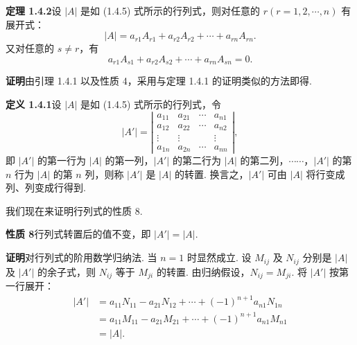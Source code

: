 \documentclass[UTF8, 12pt, fontset=fandol, oneside]{ctexart}
\begin{document}
\noindent\textbf{定理 1.4.2}\quad 设 $|A|$ 是如 (1.4.5) 式所示的行列式，则对任意的 $r(r=1,2,\cdots,n)$ 有展开式：
\begin{equation}
|A|=a_{r1}A_{r1}+a_{r2}A_{r2}+\cdots+a_{rn}A_{rn}.
\tag{1.4.6}
\end{equation}
又对任意的 $s\ne r$，有
\begin{equation}
a_{r1}A_{s1}+a_{r2}A_{s2}+\cdots+a_{rn}A_{sn}=0.
\tag{1.4.7}
\end{equation}

\noindent\textbf{证明}\quad 由引理 1.4.1 以及性质 4，采用与定理 1.4.1 的证明类似的方法即得.

\noindent\textbf{定义 1.4.1}\quad 设 $|A|$ 是如 (1.4.5) 式所示的行列式，令
\[
|A'|=
\left|\begin{array}{cccc}
a_{11} & a_{21} & \cdots & a_{n1}\\
a_{12} & a_{22} & \cdots & a_{n2}\\
\vdots & \vdots & & \vdots\\
a_{1n} & a_{2n} & \cdots & a_{nn}
\end{array}\right|,
\]
即 $|A'|$ 的第一行为 $|A|$ 的第一列，$|A'|$ 的第二行为 $|A|$ 的第二列，$\cdots\cdots$，$|A'|$ 的第 $n$ 行为 $|A|$ 的第 $n$ 列，则称 $|A'|$ 是 $|A|$ 的转置. 换言之，$|A'|$ 可由 $|A|$ 将行变成列、列变成行得到.

我们现在来证明行列式的性质 8.

\noindent\textbf{性质 8}\quad 行列式转置后的值不变，即 $|A'|=|A|$.

\noindent\textbf{证明}\quad 对行列式的阶用数学归纳法. 当 $n=1$ 时显然成立. 设 $M_{ij}$ 及 $N_{ij}$ 分别是 $|A|$ 及 $|A'|$ 的余子式，则 $N_{ij}$ 等于 $M_{ji}$ 的转置. 由归纳假设，$N_{ij}=M_{ji}$. 将 $|A'|$ 按第一行展开：
\[
\begin{aligned}
|A'|
&=a_{11}N_{11}-a_{21}N_{12}+\cdots+(-1)^{n+1}a_{n1}N_{1n}\\
&=a_{11}M_{11}-a_{21}M_{21}+\cdots+(-1)^{n+1}a_{n1}M_{n1}\\
&=|A|.
\end{aligned}
\]
\end{document}
